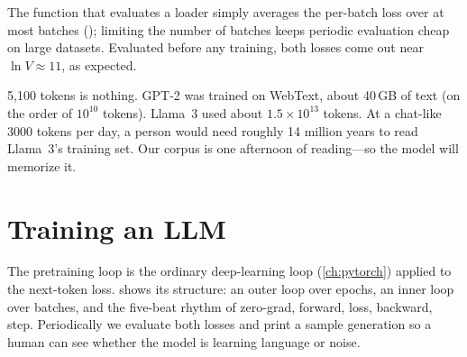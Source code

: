 The function that evaluates a loader simply averages the per-batch loss over at most
 batches (); limiting the number of batches
keeps periodic evaluation cheap on large datasets. Evaluated before any training, both losses
come out near $\ln V\approx 11$, as expected.

\begin{napkinmath}
5{,}100 tokens is nothing. GPT-2 was trained on WebText, about 40\,GB of text (on the order of
$10^{10}$ tokens). Llama~3 used about $1.5\times10^{13}$ tokens. At a chat-like
\num{3000} tokens per day, a person would need roughly 14 million years to read Llama~3's
training set. Our corpus is one afternoon of reading---so the model will memorize it.
\end{napkinmath}

\section{Training an LLM}\label{sec:pretrain:train}

The pretraining loop is the ordinary deep-learning loop (\cref{ch:pytorch}) applied to the
next-token loss.  shows its structure: an outer loop over epochs, an
inner loop over batches, and the five-beat rhythm of zero-grad, forward, loss, backward,
step. Periodically we evaluate both losses and print a sample generation so a human can see
whether the model is learning language or noise.

